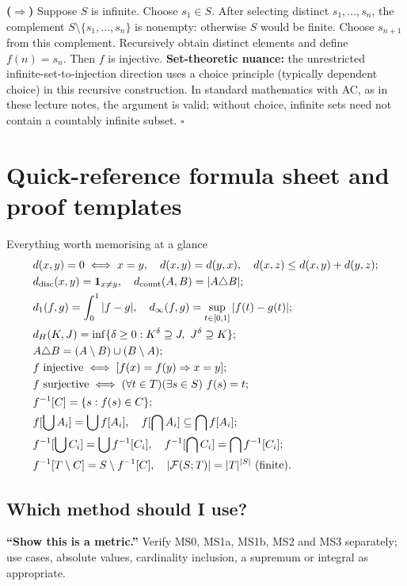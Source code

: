 \documentclass[11pt,a4paper]{article}
\begin{document}
\textbf{($\Rightarrow$)} Suppose $S$ is infinite. Choose $s_1\in S$. After selecting distinct $s_1,\ldots,s_n$, the complement $S\setminus\{s_1,\ldots,s_n\}$ is nonempty: otherwise $S$ would be finite. Choose $s_{n+1}$ from this complement. Recursively obtain distinct elements and define $f(n)=s_n$. Then $f$ is injective. \textbf{Set-theoretic nuance:} the unrestricted infinite-set-to-injection direction uses a choice principle (typically dependent choice) in this recursive construction. In standard mathematics with AC, as in these lecture notes, the argument is valid; without choice, infinite sets need not contain a countably infinite subset. $\square$
\newpage\section{Quick-reference formula sheet and proof templates}
\begin{keybox}{Everything worth memorising at a glance}
\begin{align*}
&d(x,y)=0\iff x=y,\quad d(x,y)=d(y,x),\quad d(x,z)\le d(x,y)+d(y,z);\\
&d_{\rm disc}(x,y)=\mathbf1_{x\ne y},\quad d_{\rm count}(A,B)=|A\triangle B|;\\
&d_1(f,g)=\int_0^1|f-g|,\quad d_\infty(f,g)=\sup_{t\in[0,1]}|f(t)-g(t)|;\\
&d_H(K,J)=\inf\{\delta\ge0:K^\delta\supseteq J,\ J^\delta\supseteq K\};\\
&A\triangle B=(A\setminus B)\cup(B\setminus A);\\
&f\text{ injective}\iff[f(x)=f(y)\Rightarrow x=y];\\
&f\text{ surjective}\iff (\forall t\in T)(\exists s\in S)\ f(s)=t;\\
&f^{-1}[C]=\{s:f(s)\in C\};\\
&f[\bigcup A_i]=\bigcup f[A_i],\quad f[\bigcap A_i]\subseteq\bigcap f[A_i];\\
&f^{-1}[\bigcup C_i]=\bigcup f^{-1}[C_i],\quad f^{-1}[\bigcap C_i]=\bigcap f^{-1}[C_i];\\
&f^{-1}[T\setminus C]=S\setminus f^{-1}[C],\quad |\mathcal F(S;T)|=|T|^{|S|}\ \text{(finite)}.
\end{align*}
\end{keybox}
\subsection{Which method should I use?}
\textbf{``Show this is a metric.''} Verify MS0, MS1a, MS1b, MS2 and MS3 separately; use cases, absolute values, cardinality inclusion, a supremum or integral as appropriate.
\end{document}

